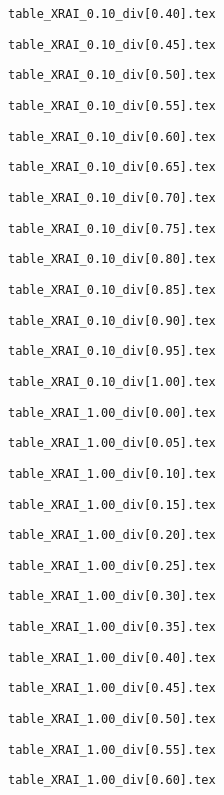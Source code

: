 \documentclass{article}
\begin{document}

\newpage
\verb|table_XRAI_0.10_div[0.40].tex|

\newpage
\verb|table_XRAI_0.10_div[0.45].tex|

\newpage
\verb|table_XRAI_0.10_div[0.50].tex|

\newpage
\verb|table_XRAI_0.10_div[0.55].tex|

\newpage
\verb|table_XRAI_0.10_div[0.60].tex|

\newpage
\verb|table_XRAI_0.10_div[0.65].tex|

\newpage
\verb|table_XRAI_0.10_div[0.70].tex|

\newpage
\verb|table_XRAI_0.10_div[0.75].tex|

\newpage
\verb|table_XRAI_0.10_div[0.80].tex|

\newpage
\verb|table_XRAI_0.10_div[0.85].tex|

\newpage
\verb|table_XRAI_0.10_div[0.90].tex|

\newpage
\verb|table_XRAI_0.10_div[0.95].tex|

\newpage
\verb|table_XRAI_0.10_div[1.00].tex|

\newpage
\verb|table_XRAI_1.00_div[0.00].tex|

\newpage
\verb|table_XRAI_1.00_div[0.05].tex|

\newpage
\verb|table_XRAI_1.00_div[0.10].tex|

\newpage
\verb|table_XRAI_1.00_div[0.15].tex|

\newpage
\verb|table_XRAI_1.00_div[0.20].tex|

\newpage
\verb|table_XRAI_1.00_div[0.25].tex|

\newpage
\verb|table_XRAI_1.00_div[0.30].tex|

\newpage
\verb|table_XRAI_1.00_div[0.35].tex|

\newpage
\verb|table_XRAI_1.00_div[0.40].tex|

\newpage
\verb|table_XRAI_1.00_div[0.45].tex|

\newpage
\verb|table_XRAI_1.00_div[0.50].tex|

\newpage
\verb|table_XRAI_1.00_div[0.55].tex|

\newpage
\verb|table_XRAI_1.00_div[0.60].tex|

\end{document}
